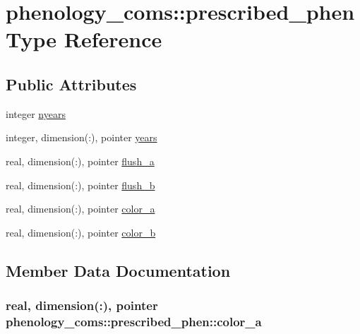 \hypertarget{structphenology__coms_1_1prescribed__phen}{}\section{phenology\+\_\+coms\+:\+:prescribed\+\_\+phen Type Reference}
\label{structphenology__coms_1_1prescribed__phen}
\subsection*{Public Attributes}
\begin{DoxyCompactItemize}
\item 
integer \hyperlink{structphenology__coms_1_1prescribed__phen_ae504780a4760ecefc6851a141bbb426b}{nyears}
\item 
integer, dimension(\+:), pointer \hyperlink{structphenology__coms_1_1prescribed__phen_ae40ae2762a61f5e09ce4162444b253b0}{years}
\item 
real, dimension(\+:), pointer \hyperlink{structphenology__coms_1_1prescribed__phen_a04026ef978e9fb2e2a602d3fb25a1b81}{flush\+\_\+a}
\item 
real, dimension(\+:), pointer \hyperlink{structphenology__coms_1_1prescribed__phen_a75c4a5b801c5e6d00dd23e7c0de13113}{flush\+\_\+b}
\item 
real, dimension(\+:), pointer \hyperlink{structphenology__coms_1_1prescribed__phen_ad1c3cc319ade0cc196131f3c1e94e64e}{color\+\_\+a}
\item 
real, dimension(\+:), pointer \hyperlink{structphenology__coms_1_1prescribed__phen_a1e62e38b18938bd089d8ac27b3d3eec0}{color\+\_\+b}
\end{DoxyCompactItemize}


\subsection{Member Data Documentation}
\subsubsection[{\texorpdfstring{color\+\_\+a}{color_a}}]{\setlength{\rightskip}{0pt plus 5cm}real, dimension(\+:), pointer phenology\+\_\+coms\+::prescribed\+\_\+phen\+::color\+\_\+a}\hypertarget{structphenology__coms_1_1prescribed__phen_ad1c3cc319ade0cc196131f3c1e94e64e}{}\label{structphenology__coms_1_1prescribed__phen_ad1c3cc319ade0cc196131f3c1e94e64e}
